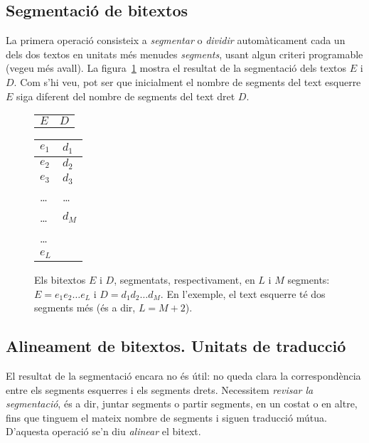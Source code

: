 \subsection{Segmentació de bitextos}
La primera operació consisteix a \emph{segmentar} o \emph{dividir}
automàticament cada un dels dos textos en unitats més menudes
\emph{segments}, usant algun criteri programable (vegeu més avall).
La figura~\ref{fg:segmentat} mostra el resultat de la segmentació dels textos $E$ i $D$. Com s'hi veu, pot ser que inicialment el nombre de segments del text esquerre $E$ siga diferent del nombre de segments del text dret $D$.
\begin{figure}
  \begin{center}
    \begin{tabular}{p{3cm}p{3cm}}
           $E$ & $D$      
    \end{tabular}
    \begin{tabular}{|p{3cm}|p{3cm}|}
\hline
        $e_1$ & $d_1$ \\\hline
        $e_2$ & $d_2$ \\\hline
        $e_3$ & $d_3$ \\\hline
        \ldots & \ldots \\\hline
        \ldots  & $d_M$ \\\hline
        \ldots \\\cline{1-1}
        $e_L$ \\\cline{1-1}
    \end{tabular}
  \end{center}
  \caption{Els bitextos $E$ i $D$, segmentats, respectivament, en $L$
    i $M$ segments: $E=e_1e_2\ldots e_L$ i $D=d_1d_2\ldots d_M$. En
    l'exemple, el text esquerre té dos segments més (és a dir, $L=M+2$).}
  \label{fg:segmentat}  
\end{figure}


\subsection{Alineament de bitextos. Unitats de traducció}

El resultat de la segmentació encara no és útil: no queda clara la
correspondència entre els segments esquerres i els segments
drets. Necessitem \emph{revisar la segmentació}, és a dir, juntar
segments o partir segments, en un costat o en altre, fins que tinguem
el mateix nombre de segments i siguen traducció mútua. D'aquesta
operació se'n diu \emph{alinear} el bitext.

